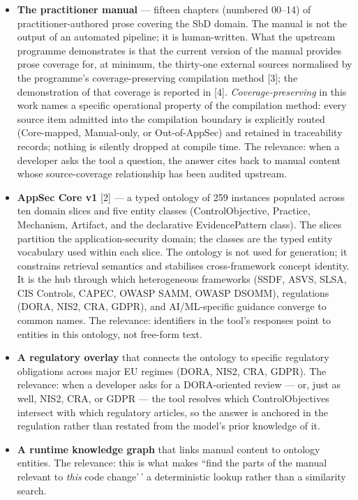 \documentclass[conference]{IEEEtran}
\begin{document}
\begin{itemize}
\item
  \textbf{The practitioner manual} --- fifteen chapters (numbered
  00--14) of practitioner-authored prose covering the SbD domain. The
  manual is not the output of an automated pipeline; it is
  human-written. What the upstream programme demonstrates is that the
  current version of the manual provides prose coverage for, at minimum,
  the thirty-one external sources normalised by the programme's
  coverage-preserving compilation method {[}3{]}; the demonstration of
  that coverage is reported in {[}4{]}. \emph{Coverage-preserving} in
  this work names a specific operational property of the compilation
  method: every source item admitted into the compilation boundary is
  explicitly routed (Core-mapped, Manual-only, or Out-of-AppSec) and
  retained in traceability records; nothing is silently dropped at
  compile time. The relevance: when a developer asks the tool a
  question, the answer cites back to manual content whose
  source-coverage relationship has been audited upstream.
\item
  \textbf{AppSec Core v1} {[}2{]} --- a typed ontology of 259 instances
  populated across ten domain slices and five entity classes
  (ControlObjective, Practice, Mechanism, Artifact, and the declarative
  EvidencePattern class). The slices partition the application-security
  domain; the classes are the typed entity vocabulary used within each
  slice. The ontology is not used for generation; it constrains
  retrieval semantics and stabilises cross-framework concept identity.
  It is the hub through which heterogeneous frameworks (SSDF, ASVS,
  SLSA, CIS Controls, CAPEC, OWASP SAMM, OWASP DSOMM), regulations
  (DORA, NIS2, CRA, GDPR), and AI/ML-specific guidance converge to
  common names. The relevance: identifiers in the tool's responses point
  to entities in this ontology, not free-form text.
\item
  \textbf{A regulatory overlay} that connects the ontology to specific
  regulatory obligations across major EU regimes (DORA, NIS2, CRA,
  GDPR). The relevance: when a developer asks for a DORA-oriented review
  --- or, just as well, NIS2, CRA, or GDPR --- the tool resolves which
  ControlObjectives intersect with which regulatory articles, so the
  answer is anchored in the regulation rather than restated from the
  model's prior knowledge of it.
\item
  \textbf{A runtime knowledge graph} that links manual content to
  ontology entities. The relevance: this is what makes ``find the parts
  of the manual relevant to \emph{this} code change'\,' a deterministic
  lookup rather than a similarity search.
\end{itemize}
\end{document}
